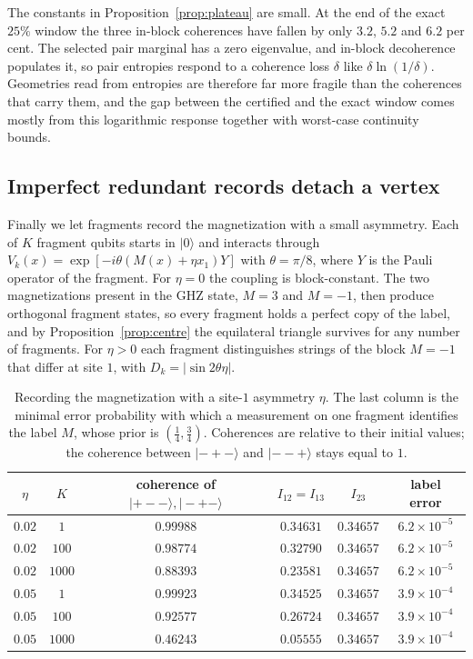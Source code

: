\documentclass[12pt,a4paper]{article}
\newcommand{\ket}[1]{|#1\rangle}
\begin{document}
The constants in Proposition~\ref{prop:plateau} are small. At the end of the exact $25\%$ window the three in-block coherences have fallen by only $3.2$, $5.2$ and $6.2$ per cent. The selected pair marginal has a zero eigenvalue, and in-block decoherence populates it, so pair entropies respond to a coherence loss $\delta$ like $\delta\ln(1/\delta)$. Geometries read from entropies are therefore far more fragile than the coherences that carry them, and the gap between the certified and the exact window comes mostly from this logarithmic response together with worst-case continuity bounds.

\subsection{Imperfect redundant records detach a vertex}

Finally we let fragments record the magnetization with a small asymmetry. Each of $K$ fragment qubits starts in $\ket0$ and interacts through $V_k(x)=\exp[-i\theta(M(x)+\eta x_1)Y]$ with $\theta=\pi/8$, where $Y$ is the Pauli operator of the fragment. For $\eta=0$ the coupling is block-constant. The two magnetizations present in the GHZ state, $M=3$ and $M=-1$, then produce orthogonal fragment states, so every fragment holds a perfect copy of the label, and by Proposition~\ref{prop:centre} the equilateral triangle survives for any number of fragments. For $\eta>0$ each fragment distinguishes strings of the block $M=-1$ that differ at site $1$, with $D_k=|\sin2\theta\eta|$.

\begin{table}[ht]
\centering
\begin{tabular}{cccccc}
\toprule
$\eta$ & $K$ & coherence of $\ket{+--},\ket{-+-}$ & $I_{12}=I_{13}$ & $I_{23}$ & label error\\
\midrule
$0.02$ & $1$ & $0.99988$ & $0.34631$ & $0.34657$ & $6.2\times10^{-5}$\\
$0.02$ & $100$ & $0.98774$ & $0.32790$ & $0.34657$ & $6.2\times10^{-5}$\\
$0.02$ & $1000$ & $0.88393$ & $0.23581$ & $0.34657$ & $6.2\times10^{-5}$\\
$0.05$ & $1$ & $0.99923$ & $0.34525$ & $0.34657$ & $3.9\times10^{-4}$\\
$0.05$ & $100$ & $0.92577$ & $0.26724$ & $0.34657$ & $3.9\times10^{-4}$\\
$0.05$ & $1000$ & $0.46243$ & $0.05555$ & $0.34657$ & $3.9\times10^{-4}$\\
\bottomrule
\end{tabular}
\caption{Recording the magnetization with a site-$1$ asymmetry $\eta$. The last column is the minimal error probability with which a measurement on one fragment identifies the label $M$, whose prior is $(\frac14,\frac34)$. Coherences are relative to their initial values; the coherence between $\ket{-+-}$ and $\ket{--+}$ stays equal to $1$.}
\label{tab:records}
\end{table}
\end{document}

